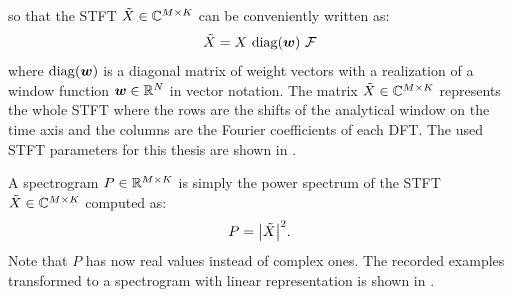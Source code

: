 so that the STFT $\tilde{X} \in \mathbb{C}^{M \times K}$ can be conveniently written as:
\begin{equation}\label{eq:signal_spec_stft_matrix}
  \tilde{X} = X \, \mathop{\mathrm{diag}(\bm{w})} \, \mathcal{F}
\end{equation}
where $\mathop{\mathrm{diag}(\bm{w})}$ is a diagonal matrix of weight vectors with a realization of a window function $\bm{w} \in \mathbb{R}^N$ in vector notation.
The matrix $\tilde{X} \in \mathbb{C}^{M \times K}$ represents the whole STFT where the rows are the shifts of the analytical window on the time axis and the columns are the Fourier coefficients of each DFT.
The used STFT parameters for this thesis are shown in .

A spectrogram $P \in \mathbb{R}^{M \times K}$ is simply the power spectrum of the STFT $\tilde{X} \in \mathbb{C}^{M \times K}$ computed as:
\begin{equation}\label{eq:signal_spec_spec}
  P = \abs{\tilde{X}}^2.
\end{equation}
Note that $P$ has now real values instead of complex ones.
The recorded examples transformed to a spectrogram with linear representation is shown in .
